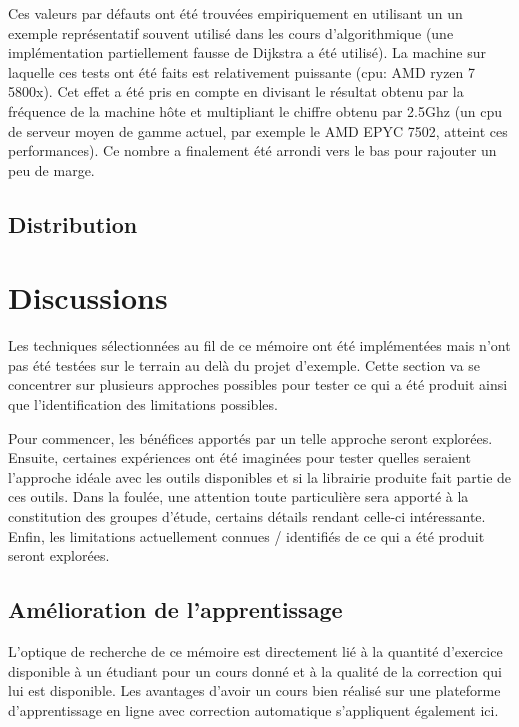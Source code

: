\documentclass[a4paper]{report}
\begin{document}
Ces valeurs par défauts ont été trouvées empiriquement en utilisant un un exemple représentatif souvent utilisé dans les cours d'algorithmique (une implémentation partiellement fausse de Dijkstra a été utilisé).
La machine sur laquelle ces tests ont été faits est relativement puissante (cpu: AMD ryzen 7 5800x).
Cet effet a été pris en compte en divisant le résultat obtenu par la fréquence de la machine hôte et multipliant le chiffre obtenu par 2.5Ghz (un cpu de serveur moyen de gamme actuel, par exemple le AMD EPYC 7502, atteint ces performances).
Ce nombre a finalement été arrondi vers le bas pour rajouter un peu de marge.

\section{Distribution}

\chapter{Discussions}

Les techniques sélectionnées au fil de ce mémoire ont été implémentées mais n'ont pas été testées sur le terrain au delà du projet d'exemple.
Cette section va se concentrer sur plusieurs approches possibles pour tester ce qui a été produit ainsi que l'identification des limitations possibles.

Pour commencer, les bénéfices apportés par un telle approche seront explorées.
Ensuite, certaines expériences ont été imaginées pour tester quelles seraient l'approche idéale avec les outils disponibles et si la librairie produite fait partie de ces outils.
Dans la foulée, une attention toute particulière sera apporté à la constitution des groupes d'étude, certains détails rendant celle-ci intéressante.
Enfin, les limitations actuellement connues / identifiés de ce qui a été produit seront explorées.

\section{Amélioration de l'apprentissage}

L'optique de recherche de ce mémoire est directement lié à la quantité d'exercice disponible à un étudiant pour un cours donné et à la qualité de la correction qui lui est disponible.
Les avantages d'avoir un cours bien réalisé sur une plateforme d'apprentissage en ligne avec correction automatique s'appliquent également ici.
\end{document}
